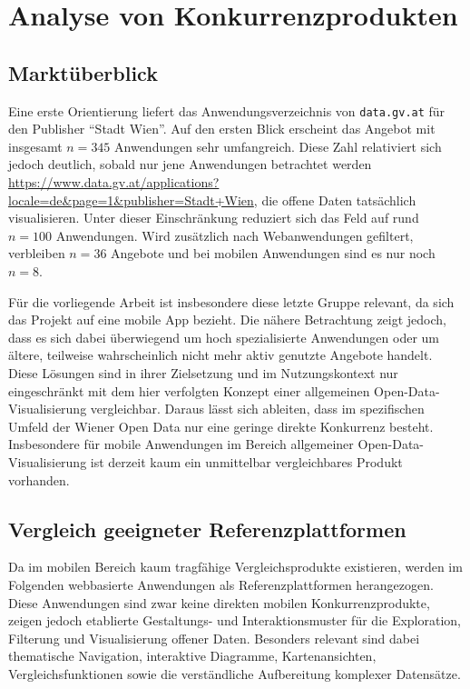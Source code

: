 \section{Analyse von Konkurrenzprodukten}

\subsection{Marktüberblick}

Eine erste Orientierung liefert das Anwendungsverzeichnis von \texttt{data.gv.at} für den Publisher \enquote{Stadt Wien}. Auf den ersten Blick erscheint das Angebot mit insgesamt $n = 345$ Anwendungen sehr umfangreich. Diese Zahl relativiert sich jedoch deutlich, sobald nur jene Anwendungen betrachtet werden \url{https://www.data.gv.at/applications?locale=de&page=1&publisher=Stadt+Wien}, die offene Daten tatsächlich visualisieren. Unter dieser Einschränkung reduziert sich das Feld auf rund $n = 100$ Anwendungen. Wird zusätzlich nach Webanwendungen gefiltert, verbleiben $n = 36$ Angebote und bei mobilen Anwendungen sind es nur noch $n = 8$.

Für die vorliegende Arbeit ist insbesondere diese letzte Gruppe relevant, da sich das Projekt auf eine mobile App bezieht. Die nähere Betrachtung zeigt jedoch, dass es sich dabei überwiegend um hoch spezialisierte Anwendungen oder um ältere, teilweise wahrscheinlich nicht mehr aktiv genutzte Angebote handelt. Diese Lösungen sind in ihrer Zielsetzung und im Nutzungskontext nur eingeschränkt mit dem hier verfolgten Konzept einer allgemeinen Open-Data-Visualisierung vergleichbar. Daraus lässt sich ableiten, dass im spezifischen Umfeld der Wiener Open Data nur eine geringe direkte Konkurrenz besteht. Insbesondere für mobile Anwendungen im Bereich allgemeiner Open-Data-Visualisierung ist derzeit kaum ein unmittelbar vergleichbares Produkt vorhanden.

\subsection{Vergleich geeigneter Referenzplattformen}

Da im mobilen Bereich kaum tragfähige Vergleichsprodukte existieren, werden im Folgenden webbasierte Anwendungen als Referenzplattformen herangezogen. Diese Anwendungen sind zwar keine direkten mobilen Konkurrenzprodukte, zeigen jedoch etablierte Gestaltungs- und Interaktionsmuster für die Exploration, Filterung und Visualisierung offener Daten. Besonders relevant sind dabei thematische Navigation, interaktive Diagramme, Kartenansichten, Vergleichsfunktionen sowie die verständliche Aufbereitung komplexer Datensätze.

